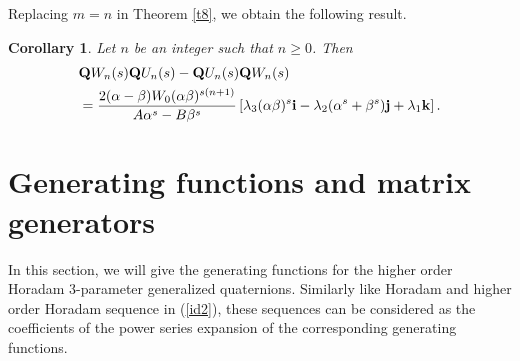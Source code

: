 \documentclass{kms-c}
\theoremstyle{plain}
\newtheorem{corollary}[theorem]{Corollary}
\theoremstyle{definition}
\theoremstyle{remark}
\begin{document}
Replacing $m=n$ in Theorem \ref{t8}, we obtain the following result.
\begin{corollary}
Let $n$ be an integer such that $n\geq 0$. Then
\begin{align*}
&\textnormal{\textbf{Q}}W_{n}(s)\textnormal{\textbf{Q}}U_{n}(s)-\textnormal{\textbf{Q}}U_{n}(s)\textnormal{\textbf{Q}}W_{n}(s)\\
&=\frac{2(\alpha-\beta)W_{0}(\alpha\beta)^{s(n+1)}}{A\alpha^{s}-B\beta^{s}}\left[\lambda_{3}(\alpha\beta)^{s}\textnormal{\textbf{i}}-\lambda_{2}(\alpha^{s}+\beta^{s})\textnormal{\textbf{j}}+\lambda_{1}\textnormal{\textbf{k}}\right].
\end{align*}
\end{corollary}

\section{Generating functions and matrix generators}

In this section, we will give the generating functions for the higher order Horadam 3-parameter generalized quaternions. Similarly like Horadam and higher order Horadam sequence in (\ref{id2}), these sequences can be considered as the coefficients of the power series expansion of the corresponding generating functions. 
\end{document}
